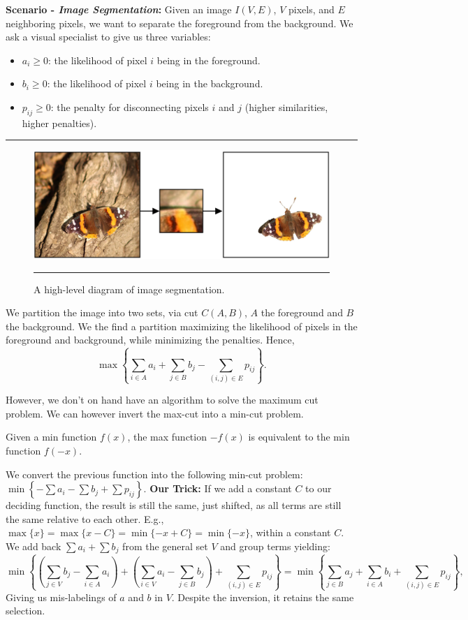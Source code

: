 \newpage
\noindent
\textbf{Scenario - \textit{Image Segmentation}:} Given an image $I(V,E)$, $V$ pixels, and $E$ neighboring pixels, we want to
separate the foreground from the background. We ask a visual specialist to give us three variables: 

\begin{itemize}
    \item $a_i\geq 0$: the likelihood of pixel $i$ being in the foreground.
    \item $b_i \geq 0$: the likelihood of pixel $i$ being in the background.
    \item $p_{ij} \geq 0$: the penalty for disconnecting pixels $i$ and $j$ (higher similarities, higher penalties).
\end{itemize}

\vspace{-1em}
\noindent\rule{\textwidth}{0.4pt}

\begin{figure}[h]
    \centering
    \includegraphics[width=.7\textwidth]{Sections/net/butterfly.png}
    \noindent\rule{\textwidth}{0.4pt}
    \caption{A high-level diagram of image segmentation.}
    \label{fig:butterfly}
\end{figure}

\noindent
We partition the image into two sets, via cut $C(A,B)$, $A$ the foreground and $B$ the background.
We the find a partition maximizing the likelihood of pixels in the foreground and background, while minimizing the penalties.
Hence, 
$$\displaystyle\max\left\{\sum_{i\in A} a_i + \sum_{j\in B} b_j - \sum_{(i,j)\in E} p_{ij}\right\}.$$

\noindent
However, we don't on hand have an algorithm to solve the maximum cut problem. We can however invert the max-cut into a min-cut problem.
\begin{theo}

    Given a min function $f(x)$, the max function $-f(x)$ is equivalent to the min function $f(-x)$.
\end{theo}
We convert the previous function into the following min-cut problem: 
$\displaystyle\min\left\{-\sum a_i - \sum b_j + \sum p_{ij}\right\}.$ 
\textbf{Our Trick:} If we add a constant $C$ to our deciding function, the result is still the same, just shifted,
as all terms are still the same relative to each other. E.g., $\max\{x\} = \max\{x-C\}= \min\{-x+C\}= \min\{-x\}$, within a constant $C$.
We add back $\sum a_i + \sum b_j$ from the general set $V$ and group terms yielding:
$$\min\left\{\left(\sum_{j\in V} b_j - \sum_{i\in A} a_i \right) + \left(\sum_{i\in V} a_i - \sum_{j\in B} b_j\right) + \sum_{(i,j)\in E} p_{ij}\right\}=
\min\left\{\sum_{j\in B} a_j + \sum_{i\in A} b_i + \sum_{(i,j)\in E} p_{ij}\right\},$$
Giving us mis-labelings of $a$ and $b$ in $V$. Despite the inversion, it retains the same selection.

